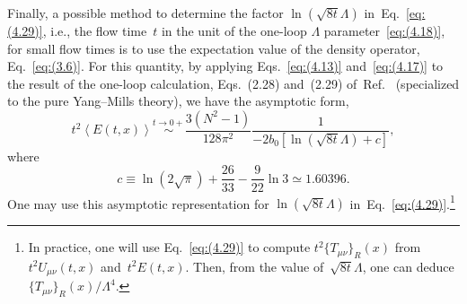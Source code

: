 Finally, a possible method to determine the factor $\ln(\sqrt{8t}\Lambda)$
in~Eq.~\eqref{eq:(4.29)}, i.e., the flow time~$t$ in the unit of the one-loop
$\Lambda$ parameter~\eqref{eq:(4.18)}, for small flow times is to use the
expectation value of the density operator, Eq.~\eqref{eq:(3.6)}. For this
quantity, by applying Eqs.~\eqref{eq:(4.13)} and~\eqref{eq:(4.17)} to the
result of the one-loop calculation, Eqs.~(2.28) and~(2.29)
of~Ref.~\cite{Luscher:2010iy} (specialized to the pure Yang--Mills theory), we
have the asymptotic form,
\begin{equation}
   t^2\left\langle E(t,x)\right\rangle
   \stackrel{t\to0+}{\sim}
   \frac{3(N^2-1)}{128\pi^2}
   \frac{1}{-2b_0\left[\ln(\sqrt{8t}\Lambda)+c\right]},
\label{eq:(4.32)}
\end{equation}
where
\begin{equation}
   c\equiv\ln(2\sqrt{\pi})+\frac{26}{33}-\frac{9}{22}\ln3
   \simeq1.60396.
\label{eq:(4.33)}
\end{equation}
One may use this asymptotic representation for $\ln(\sqrt{8t}\Lambda)$
in~Eq.~\eqref{eq:(4.29)}.\footnote{In practice, one will use
Eq.~\eqref{eq:(4.29)} to compute $t^2\{T_{\mu\nu}\}_R(x)$
from~$t^2U_{\mu\nu}(t,x)$ and~$t^2E(t,x)$. Then, from the value
of~$\sqrt{8t}\Lambda$, one can deduce $\{T_{\mu\nu}\}_R(x)/\Lambda^4$.}
